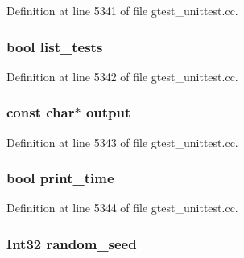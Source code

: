 \-Definition at line 5341 of file gtest\-\_\-unittest.\-cc.

\hypertarget{structtesting_1_1Flags_ab0b0822704f0f95b24c601775241cdd0}{
\subsubsection[{list\-\_\-tests}]{\setlength{\rightskip}{0pt plus 5cm}bool {\bf list\-\_\-tests}}}\label{d6/d20/structtesting_1_1Flags_ab0b0822704f0f95b24c601775241cdd0}


\-Definition at line 5342 of file gtest\-\_\-unittest.\-cc.

\hypertarget{structtesting_1_1Flags_a5a832fe6e2412dfabb93a2adae30e745}{
\subsubsection[{output}]{\setlength{\rightskip}{0pt plus 5cm}const char$\ast$ {\bf output}}}\label{d6/d20/structtesting_1_1Flags_a5a832fe6e2412dfabb93a2adae30e745}


\-Definition at line 5343 of file gtest\-\_\-unittest.\-cc.

\hypertarget{structtesting_1_1Flags_aae09f92702205b07abd2550a2a6e4abc}{
\subsubsection[{print\-\_\-time}]{\setlength{\rightskip}{0pt plus 5cm}bool {\bf print\-\_\-time}}}\label{d6/d20/structtesting_1_1Flags_aae09f92702205b07abd2550a2a6e4abc}


\-Definition at line 5344 of file gtest\-\_\-unittest.\-cc.

\hypertarget{structtesting_1_1Flags_aeb96806e7c2121849ca67ce6b688dd34}{
\subsubsection[{random\-\_\-seed}]{\setlength{\rightskip}{0pt plus 5cm}\-Int32 {\bf random\-\_\-seed}}}\label{d6/d20/structtesting_1_1Flags_aeb96806e7c2121849ca67ce6b688dd34}


